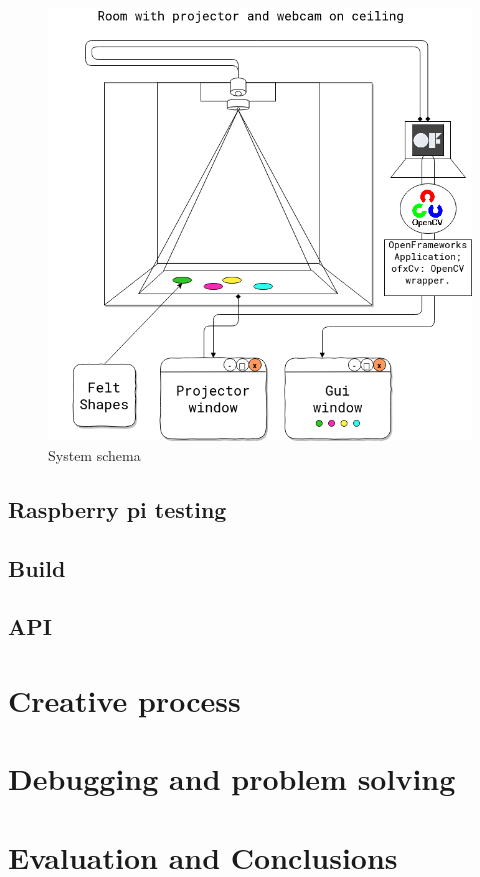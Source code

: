 \documentclass[12pt]{report}
\begin{document}
\begin{figure}[htbp]
\centering
\includegraphics[width=15cm]{assets/project-schema-final.png}
\caption{System schema \label{systemSchema}}
\end{figure}

\section{Raspberry pi testing}
\label{sec:orgc3cf169}

\section{Build}
\label{sec:orgb218202}

\section{API}
\label{sec:org8660844}

\section{}
\label{sec:orgec11ad0}

\chapter{Creative process}
\label{sec:org477ac17}
\chapter{Debugging and problem solving}
\label{sec:org7bf93f5}
\chapter{Evaluation and Conclusions}
\label{sec:orgf7a68da}
 

\end{document}
